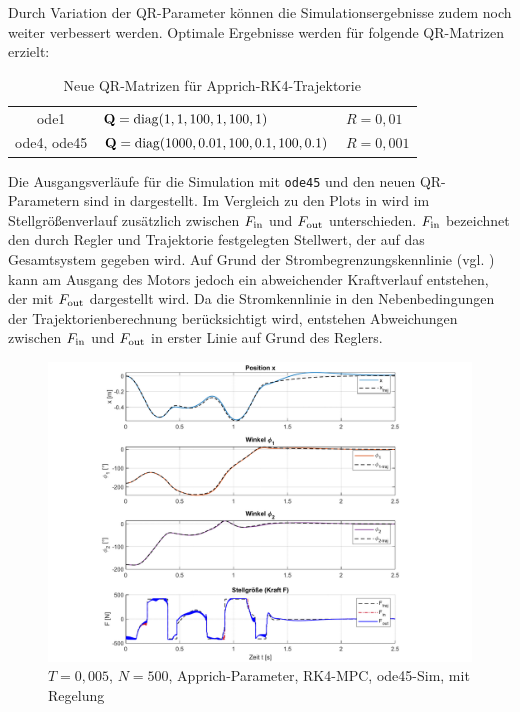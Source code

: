 Durch Variation der QR-Parameter können die Simulationsergebnisse zudem noch weiter verbessert werden. Optimale Ergebnisse werden für folgende QR-Matrizen erzielt:
\begin{table}
	\centering
		\begin{tabular}{cll}
			ode1        & ${\boldsymbol{\mathrm{Q}}} = \mathrm{diag}(1, 1, 100, 1, 100, 1)$           & $R=0,01$ \\
			ode4, ode45 & ${\boldsymbol{\mathrm{Q}}} = \mathrm{diag}(1000, 0.01, 100, 0.1, 100, 0.1)$ & $R=0,001$ \\
		\end{tabular}
	\caption{Neue QR-Matrizen für Apprich-RK4-Trajektorie}
	\label{tab:NeueQR}
\end{table}

Die Ausgangsverläufe für die Simulation mit \texttt{ode45} und den neuen QR-Parametern sind in  dargestellt. Im Vergleich zu den Plots in  wird im Stellgrößenverlauf zusätzlich zwischen $F_{\mathrm{in}}$ und $F_{\mathrm{out}}$ unterschieden. $F_{\mathrm{in}}$ bezeichnet den durch Regler und Trajektorie festgelegten Stellwert, der auf das Gesamtsystem gegeben wird. Auf Grund der Strombegrenzungskennlinie (vgl. ) kann am Ausgang des Motors jedoch ein abweichender Kraftverlauf entstehen, der mit $F_{\mathrm{out}}$ dargestellt wird. Da die Stromkennlinie in den Nebenbedingungen der Trajektorienberechnung berücksichtigt wird, entstehen Abweichungen zwischen $F_{\mathrm{in}}$ und $F_{\mathrm{out}}$ in erster Linie auf Grund des Reglers. 
\begin{figure}[h]
	\centering
		\includegraphics[scale=\scaleyplots]{Bilder/Trajektorien/F410T0.005_app_rk4_ode45_TFR_QR-neu.pdf}
	\caption{$T=0,005$, $N=500$, Apprich-Parameter, RK4-MPC, ode45-Sim, mit Regelung}
	\label{fig:F410T0.005_app_rk4_ode45_TFR_QR-neu}
\end{figure}


